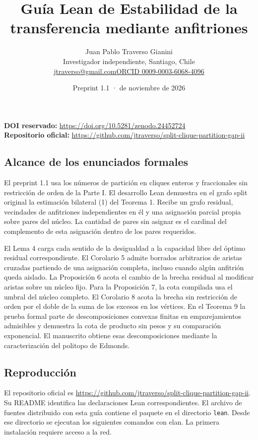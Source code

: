 \documentclass[spanish,10pt,a4paper]{article}
\title{Guía Lean de Estabilidad de la transferencia mediante anfitriones}
\author{Juan Pablo Traverso Gianini\\\small Investigador independiente, Santiago, Chile\\\small\href{mailto:jtraverso@gmail.com}{jtraverso@gmail.com}\quad\href{https://orcid.org/0009-0003-6068-4096}{ORCID 0009-0003-6068-4096}}
\date{Preprint 1.1 \enspace · \enspace 23 de noviembre de 2026}
\begin{document}
\raggedbottom\maketitle\vspace{-1.5em}
\noindent\textbf{DOI reservado:} \url{https://doi.org/10.5281/zenodo.24452724}\\
\textbf{Repositorio oficial:} \url{https://github.com/jtraverso/split-clique-partition-gap-ii}
\subsection{Alcance de los enunciados formales}\label{alcance-de-los-enunciados-formales}

El preprint 1.1 usa los números de partición en cliques enteros y fraccionales sin restricción de orden de la Parte I. El desarrollo Lean demuestra en el grafo split original la estimación bilateral (1) del Teorema 1. Recibe un grafo residual, vecindades de anfitriones independientes en él y una asignación parcial propia sobre pares del núcleo. La cantidad de pares sin asignar es el cardinal del complemento de esta asignación dentro de los pares requeridos.

El Lema 4 carga cada sentido de la desigualdad a la capacidad libre del óptimo residual correspondiente. El Corolario 5 admite borrados arbitrarios de aristas cruzadas partiendo de una asignación completa, incluso cuando algún anfitrión queda aislado. La Proposición 6 acota el cambio de la brecha residual al modificar aristas sobre un núcleo fijo. Para la Proposición 7, la cota compilada usa el umbral del núcleo completo. El Corolario 8 acota la brecha sin restricción de orden por el doble de la suma de los excesos en los vértices. En el Teorema 9 la prueba formal parte de descomposiciones convexas finitas en emparejamientos admisibles y demuestra la cota de producto sin pesos y su comparación exponencial. El manuscrito obtiene esas descomposiciones mediante la caracterización del politopo de Edmonds.

\subsection{Reproducción}\label{reproducciuxf3n}

El repositorio oficial es \url{https://github.com/jtraverso/split-clique-partition-gap-ii}. Su README identifica las declaraciones Lean correspondientes. El archivo de fuentes distribuido con esta guía contiene el paquete en el directorio \texttt{lean}. Desde ese directorio se ejecutan los siguientes comandos con elan. La primera instalación requiere acceso a la red.
\end{document}
